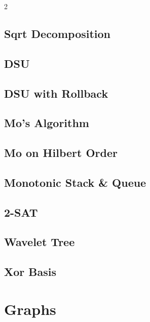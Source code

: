 \documentclass[10pt,a4paper]{extarticle}
\begin{document}
\begin{landscape}
\begin{multicols}{2}
\subsection{Sqrt Decomposition}


\subsection{DSU}


\subsection{DSU with Rollback}


\subsection{Mo's Algorithm}


\subsection{Mo on Hilbert Order}


\subsection{Monotonic Stack \& Queue}


\subsection{2-SAT}


\subsection{Wavelet Tree}


\subsection{Xor Basis}


\section{Graphs}


\end{multicols}
\end{landscape}
\end{document}
